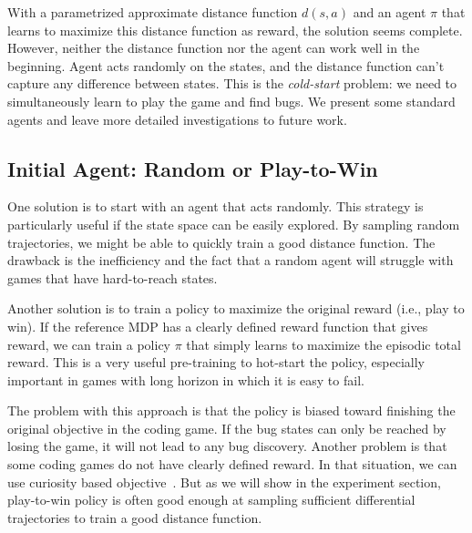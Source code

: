 \documentclass{article}
\newcommand{\EDIT}[1]{#1}%
\begin{document}
\EDIT{With a parametrized approximate distance function $d(s, a)$ and an agent $\pi$ that learns to maximize this distance function as reward, the solution seems complete. However, neither the distance function nor the agent can work well in the beginning. Agent acts randomly on the states, and the distance function can't capture any difference between states. This is the \textit{cold-start} problem: we need to simultaneously learn to play the game and find bugs.}
We \EDIT{present some standard} agents and \EDIT{leave} more detailed investigations to future work.









\vspace{-2mm} 
\subsection{Initial Agent: \EDIT{Random or Play-to-Win}}
\label{sec:ct-agent}
\vspace{-2mm} 
\EDIT{One solution is to start with an agent that acts randomly. This strategy is particularly useful if the state space can be easily explored. By sampling random trajectories, we might be able to quickly train a good distance function. The drawback is the inefficiency and the fact that a random agent will struggle with games that have hard-to-reach states.} %

\EDIT{Another solution is to train a policy to maximize the original reward (i.e., play to win)}. If the reference MDP has a clearly defined reward function that gives reward, we can train a policy $\pi$ that simply learns to maximize the episodic total reward. This is a very useful pre-training to hot-start the policy, especially \EDIT{important} in games with long horizon in which it is easy to fail. 

The problem with this approach is that the policy is biased toward finishing the original objective in the coding game. \EDIT{If the bug states can only be reached by losing the game,} it will not lead to any bug discovery. Another problem is that some coding games do not have clearly defined reward. \EDIT{In that situation, we can use curiosity based objective~\citep{pathak2017curiosity}.} But as we will show in the experiment section, play-to-win policy is often good enough at sampling sufficient differential trajectories to train a good distance function.

\vspace{-2mm} 
\end{document}
